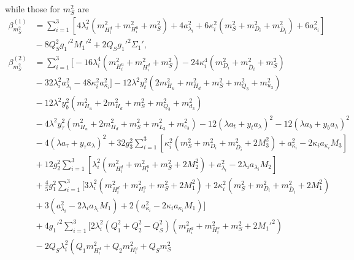\documentclass[preprint,amsmath,amssymb,aps,superscriptaddress,prd,
showpacs,floatfix,nofootinbib]{revtex4-1}
\begin{document}
while those for $m_S^2$ are
\begin{subequations}
\begin{align}
\beta_{m_S^2}^{(1)} &= \sum_{i=1}^3 \left [ 4 \lambda_i^2 \left ( m_{H_i^d}^2
+ m_{H_i^u}^2 + m_S^2 \right ) + 4 a_{\lambda_i}^2 + 6\kappa_i^2 \left ( m_S^2
+ m_{D_i}^2 + m_{\overline{D}_i}^2 \right ) + 6 a_{\kappa_i}^2 \right ]
\nonumber \\
& {} - 8 Q_S^2 g_1'^2 M_1'^2 + 2 Q_S g_1'^2 \Sigma_1' ,
\label{eq:USSMms2BetaOneLoop} \\
\beta_{m_S^2}^{(2)} &= \sum_{i=1}^3 \bigg [ -16 \lambda_i^4
\left ( m_{H_i^u}^2 + m_{H_i^d}^2 + m_S^2 \right ) - 24 \kappa_i^4
\left ( m_{D_i}^2 + m_{\overline{D}_i}^2 + m_S^2 \right ) \nonumber \\
& {} - 32 \lambda_i^2 a_{\lambda_i}^2 - 48 \kappa_i^2 a_{\kappa_i}^2 \bigg ]
- 12 \lambda^2 y_t^2 \left ( 2 m_{H_u}^2 + m_{H_d}^2 + m_S^2 + m_{Q_3}^2 +
m_{u_3}^2 \right ) \nonumber \\
& {} - 12 \lambda^2 y_b^2 \left ( m_{H_u}^2 + 2 m_{H_d}^2 + m_S^2 + m_{Q_3}^2
+ m_{d_3}^2 \right ) \nonumber \\
& {} - 4 \lambda^2 y_\tau^2 \left ( m_{H_u}^2 + 2 m_{H_d}^2 + m_S^2 +
m_{L_3}^2 + m_{e_3}^2 \right ) - 12 \left ( \lambda a_t + y_t a_\lambda
\right )^2 - 12 \left ( \lambda a_b + y_b a_\lambda \right )^2 \nonumber \\
& {} - 4 \left ( \lambda a_\tau + y_\tau a_\lambda \right )^2 +
32 g_3^2 \sum_{i=1}^3 \left [ \kappa_i^2 \left ( m_S^2 + m_{D_i}^2 +
m_{\overline{D}_i}^2 + 2 M_3^2 \right ) + a_{\kappa_i}^2 -
2 \kappa_i a_{\kappa_i} M_3 \right ] \nonumber \\
& {} + 12 g_2^2 \sum_{i=1}^3 \left [ \lambda_i^2 \left ( m_{H_i^d}^2 +
m_{H_i^u}^2 + m_S^2 + 2 M_2^2 \right ) + a_{\lambda_i}^2 -
2 \lambda_i a_{\lambda_i} M_2 \right ] \nonumber \\
& {} + \frac{4}{5} g_1^2 \sum_{i=1}^3 \bigg [ 3 \lambda_i^2
\left ( m_{H_i^d}^2 + m_{H_i^u}^2 + m_S^2 + 2 M_1^2 \right ) + 2 \kappa_i^2
\left ( m_S^2 + m_{D_i}^2 + m_{\overline{D}_i}^2 + 2 M_1^2 \right )
\nonumber \\
& {} + 3 \left ( a_{\lambda_i}^2 - 2 \lambda_i a_{\lambda_i} M_1 \right ) +
2 \left ( a_{\kappa_i}^2 - 2 \kappa_i a_{\kappa_i} M_1 \right ) \bigg ]
\nonumber \\
& {} + 4 g_1'^2 \sum_{i=1}^3 \bigg [ 2 \lambda_i^2 \left ( Q_1^2 + Q_2^2 -
Q_S^2 \right ) \left ( m_{H_i^d}^2 + m_{H_i^u}^2 + m_S^2 + 2 M_1'^2 \right )
\nonumber \\
& {} - 2 Q_S \lambda_i^2 \left ( Q_1 m_{H_i^d}^2 + Q_2 m_{H_i^u}^2 + Q_S m_S^2

\end{align}
\end{subequations}
\end{document}
